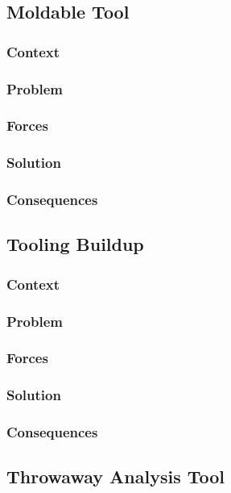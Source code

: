\documentclass[sigconf]{acmart}
\begin{document}
\subsection{Moldable Tool}
\cite{Chis17a}
\subsubsection*{Context}
\subsubsection*{Problem}
\subsubsection*{Forces}
\subsubsection*{Solution}
\subsubsection*{Consequences}



\subsection{Tooling Buildup}
\subsubsection*{Context}
\subsubsection*{Problem}
\subsubsection*{Forces}
\subsubsection*{Solution}
\subsubsection*{Consequences}



\subsection{Throwaway Analysis Tool}
\end{document}
